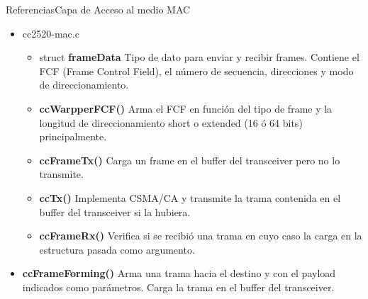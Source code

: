 \documentclass[aspectratio=169,handout]{beamer}
\begin{document}
\begin{frame}[t]{Referencias}{Capa de Acceso al medio MAC}
	\begin{itemize}
		\item cc2520-mac.c
		\vspace{5px}
		\begin{itemize}
			\item struct \textbf{frameData} Tipo de dato para enviar y recibir frames. Contiene el FCF (Frame Control Field), el número de secuencia, direcciones y modo de direccionamiento.
			\vspace{5px}
			\item \textbf{ccWarpperFCF()} Arma el FCF en función del tipo de frame y la longitud de direccionamiento short o extended (16 ó 64 bits) principalmente.
			\vspace{5px}
			\item \textbf{ccFrameTx()} Carga un frame en el buffer del transceiver pero no lo transmite.
			\vspace{5px}
			\item \textbf{ccTx()} Implementa CSMA/CA y transmite la trama contenida en el buffer del transceiver si la hubiera.
			\vspace{5px}
			\item \textbf{ccFrameRx()} Verifica si se recibió una trama en cuyo caso la carga en la estructura pasada como argumento.
		\end{itemize}
		\vspace{10px}
		\item \textbf{ccFrameForming()} Arma una trama hacia el destino  y con el payload indicados como parámetros. Carga la trama en el buffer del transceiver.
	\end{itemize}

\end{frame}
\end{document}
